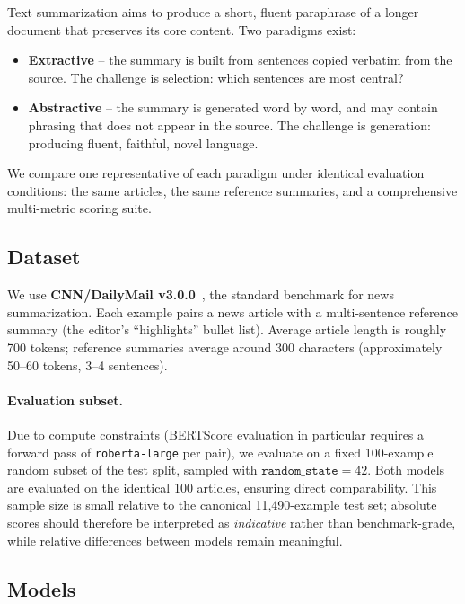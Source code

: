 \documentclass[11pt,a4paper]{article}
\begin{document}
Text summarization aims to produce a short, fluent paraphrase of a longer
document that preserves its core content. Two paradigms exist:
\begin{itemize}[noitemsep]
    \item \textbf{Extractive} -- the summary is built from sentences copied
    verbatim from the source. The challenge is selection: which sentences
    are most central?
    \item \textbf{Abstractive} -- the summary is generated word by word, and
    may contain phrasing that does not appear in the source. The challenge
    is generation: producing fluent, faithful, novel language.
\end{itemize}
We compare one representative of each paradigm under identical
evaluation conditions: the same articles, the same reference summaries,
and a comprehensive multi-metric scoring suite.

\subsection{Dataset}

We use \textbf{CNN/DailyMail v3.0.0}~\cite{hermann2015cnn,nallapati2016cnn},
the standard benchmark for news summarization. Each example pairs a
news article with a multi-sentence reference summary (the editor's
``highlights'' bullet list). Average article length is roughly 700
tokens; reference summaries average around 300 characters
(approximately 50--60 tokens, 3--4 sentences).

\paragraph{Evaluation subset.} Due to compute constraints (BERTScore
evaluation in particular requires a forward pass of \texttt{roberta-large}
per pair), we evaluate on a fixed 100-example random subset of the test
split, sampled with $\texttt{random\_state}=42$. Both models are
evaluated on the identical 100 articles, ensuring direct comparability.
This sample size is small relative to the canonical 11{,}490-example
test set; absolute scores should therefore be interpreted as
\emph{indicative} rather than benchmark-grade, while relative
differences between models remain meaningful.

\subsection{Models}
\end{document}

